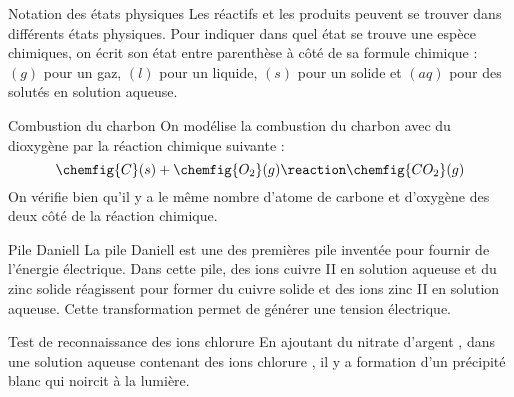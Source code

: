 \begin{doc}{Notation des états physiques}
  Les réactifs et les produits peuvent se trouver dans différents états physiques.
  Pour indiquer dans quel état se trouve une espèce chimiques, on écrit son état entre parenthèse à côté de sa formule chimique : $(g)$ pour un gaz, $(l)$ pour un liquide, $(s)$ pour un solide et $(aq)$ pour des solutés en solution aqueuse.
\end{doc}

\newpage
\vspace*{-40pt}
\begin{doc}{Combustion du charbon}
  On modélise la combustion du charbon avec du dioxygène par la réaction chimique suivante :
  \begin{equation*}
    \chemfig{C}(s) + \chemfig{O_2}(g) \reaction \chemfig{CO_2}(g)
  \end{equation*}
  On vérifie bien qu'il y a le même nombre d'atome de carbone et d'oxygène des deux côté de la réaction chimique.
\end{doc}




\vspace*{-8pt}
\begin{doc}{Pile Daniell}
  La pile Daniell est une des premières pile inventée pour fournir de l'énergie électrique.
  Dans cette pile, des ions cuivre II  en solution aqueuse et du zinc solide  réagissent pour former du cuivre solide  et des ions zinc II  en solution aqueuse.
  Cette transformation permet de générer une tension électrique.
\end{doc}




\vspace*{-8pt}
\begin{doc}{Test de reconnaissance des ions chlorure}
  En ajoutant du nitrate d'argent , dans une solution aqueuse contenant des ions chlorure , il y a formation d'un précipité blanc qui noircit à la lumière.
\end{doc}

